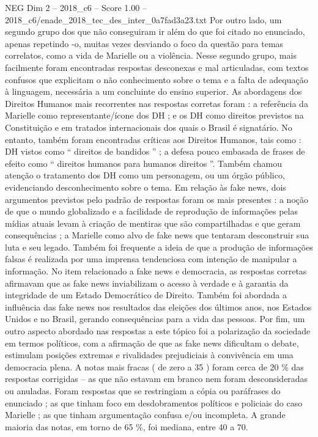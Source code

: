 \begin{textsample}{NEG Dim 2 – 2018\_c6 – Score 1.00 – 2018\_c6/enade\_2018\_tec\_des\_inter\_0a7fad3a23.txt}
Por outro lado, um segundo grupo dos que não conseguiram ir além do que foi citado no enunciado, apenas repetindo -o, muitas vezes desviando o foco da questão para temas correlatos, como a vida de Marielle ou a violência.
Nesse segundo grupo, mais facilmente foram encontradas respostas desconexas e mal articuladas, com textos confusos que explicitam o não conhecimento sobre o tema e a falta de adequação à linguagem, necessária a um concluinte do ensino superior.
As abordagens dos Direitos Humanos mais recorrentes nas respostas corretas foram : a referência da Marielle como representante/ícone dos DH ; e os DH como direitos previstos na Constituição e em tratados internacionais dos quais o Brasil é signatário.
No entanto, também foram encontradas críticas aos Direitos Humanos, tais como : DH vistos como “ direitos de bandidos ” ; a defesa pouco embasada de frases de efeito como “ direitos humanos para humanos direitos ”.
Também chamou atenção o tratamento dos DH como um personagem, ou um órgão público, evidenciando desconhecimento sobre o tema.
Em relação às fake news, dois argumentos previstos pelo padrão de respostas foram os mais presentes : a noção de que o mundo globalizado e a facilidade de reprodução de informações pelas mídias atuais levam à criação de mentiras que são compartilhadas e que geram consequências ; a Marielle como alvo de fake news que tentaram desconstruir sua luta e seu legado.
Também foi frequente a ideia de que a produção de informações falsas é realizada por uma imprensa tendenciosa com intenção de manipular a informação.
No item relacionado a fake news e democracia, as respostas corretas afirmavam que as fake news inviabilizam o acesso à verdade e à garantia da integridade de um Estado Democrático de Direito.
Também foi abordada a influência das fake news nos resultados das eleições dos últimos anos, nos Estados Unidos e no Brasil, gerando consequências para a vida das pessoas.
Por fim, um outro aspecto abordado nas respostas a este tópico foi a polarização da sociedade em termos políticos, com a afirmação de que as fake news dificultam o debate, estimulam posições extremas e rivalidades prejudiciais à convivência em uma democracia plena.
A notas mais fracas ( de zero a 35 ) foram cerca de 20 \% das respostas corrigidas – as que não estavam em branco nem foram desconsideradas ou anuladas.
Foram respostas que se restringiam a cópia ou paráfrases do enunciado ; as que tinham foco em desdobramentos políticos e policiais do caso Marielle ; as que tinham argumentação confusa e/ou incompleta.
A grande maioria das notas, em torno de 65 \%, foi mediana, entre 40 a 70.

\end{textsample}
